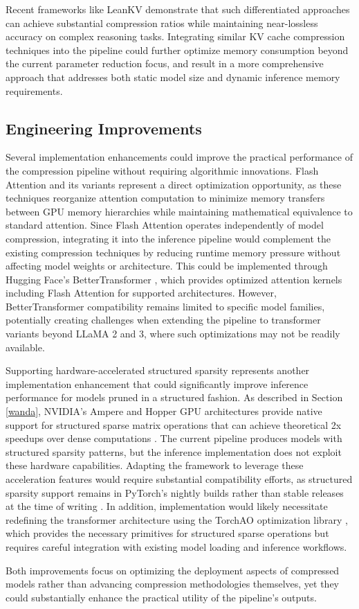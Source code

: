Recent frameworks like LeanKV \cite{kvcompr2} demonstrate that such differentiated approaches can achieve substantial compression ratios while maintaining near-lossless accuracy on complex reasoning tasks. Integrating similar KV cache compression techniques into the pipeline could further optimize memory consumption beyond the current parameter reduction focus, and result in a more comprehensive approach that addresses both static model size and dynamic inference memory requirements.

\subsection{Engineering Improvements} \label{sec:future_work_engineering}
Several implementation enhancements could improve the practical performance of the compression pipeline without requiring algorithmic innovations. Flash Attention \cite{flash_attention} and its variants represent a direct optimization opportunity, as these techniques reorganize attention computation to minimize memory transfers between GPU memory hierarchies while maintaining mathematical equivalence to standard attention. Since Flash Attention operates independently of model compression, integrating it into the inference pipeline would complement the existing compression techniques by reducing runtime memory pressure without affecting model weights or architecture. This could be implemented through Hugging Face's BetterTransformer \cite{bettertransformer}, which provides optimized attention kernels including Flash Attention for supported architectures. However, BetterTransformer compatibility remains limited to specific model families, potentially creating challenges when extending the pipeline to transformer variants beyond LLaMA 2 and 3, where such optimizations may not be readily available.

Supporting hardware-accelerated structured sparsity represents another implementation enhancement that could significantly improve inference performance for models pruned in a structured fashion. As described in Section \ref{wanda}, NVIDIA's Ampere and Hopper GPU architectures provide native support for structured sparse matrix operations that can achieve theoretical 2x speedups over dense computations \cite{nvidia-width}. The current pipeline produces models with structured sparsity patterns, but the inference implementation does not exploit these hardware capabilities. Adapting the framework to leverage these acceleration features would require substantial compatibility efforts, as structured sparsity support remains in PyTorch's nightly builds rather than stable releases at the time of writing \cite{pytorch_sparsity}. In addition, implementation would likely necessitate redefining the transformer architecture using the TorchAO optimization library \cite{torchao}, which provides the necessary primitives for structured sparse operations but requires careful integration with existing model loading and inference workflows.

Both improvements focus on optimizing the deployment aspects of compressed models rather than advancing compression methodologies themselves, yet they could substantially enhance the practical utility of the pipeline's outputs.